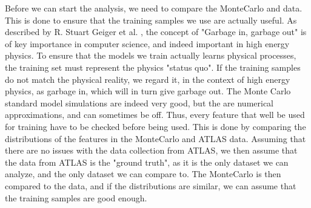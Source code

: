Before we can start the analysis, we need to compare the MonteCarlo and data. This is done to ensure that the training samples we use are actually useful. As described by R. Stuart 
Geiger et al. \cite{DBLP:journals/corr/abs-2107-02278}, the concept of "Garbage in, garbage out" is of key importance in computer science, and indeed important in high energy physics. 
To ensure that the models we train actually learns physical processes, the training set must represent the physics "status quo". If the training samples do not match the physical reality,
we regard it, in the context of high energy physics, as garbage in, which will in turn give garbage out. The Monte Carlo standard model simulations are indeed very good, but the are 
numerical approximations, and can sometimes be off. Thus, every feature that well be used for training have to be checked before being used. This is done by comparing the distributions 
of the features in the MonteCarlo and ATLAS data. Assuming that there are no issues with the data collection from ATLAS, we then assume that the data from ATLAS is the "ground truth", as it 
is the only dataset we can analyze, and the only dataset we can compare to. The MonteCarlo is then compared to the data, and if the distributions are similar, we can assume that the 
training samples are good enough. 



